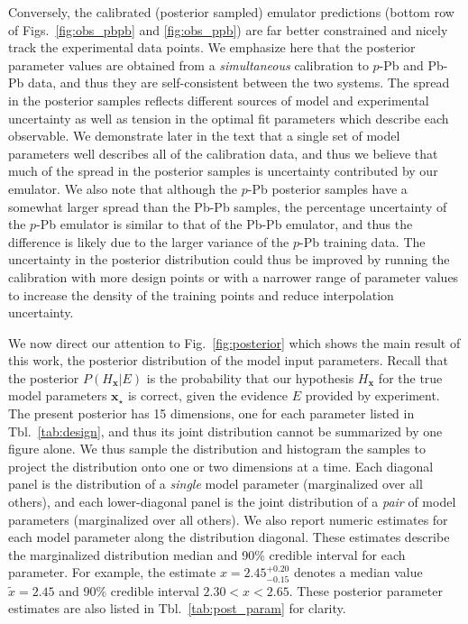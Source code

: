 \documentclass[aps,prc,reprint,amsmath,nofootinbib]{revtex4-1}
\newcommand{\x}{\mathbf x}
\begin{document}
Conversely, the calibrated (posterior sampled) emulator predictions (bottom row of Figs.~\ref{fig:obs_pbpb} and \ref{fig:obs_ppb}) are far better constrained and nicely track the experimental data points.
We emphasize here that the posterior parameter values are obtained from a \emph{simultaneous} calibration to $p$-Pb and Pb-Pb data, and thus they are self-consistent between the two systems.
The spread in the posterior samples reflects different sources of model and experimental uncertainty as well as tension in the optimal fit parameters which describe each observable.
We demonstrate later in the text that a single set of model parameters well describes all of the calibration data, and thus we believe that much of the spread in the posterior samples is uncertainty contributed by our emulator.
We also note that although the $p$-Pb posterior samples have a somewhat larger spread than the Pb-Pb samples, the percentage uncertainty of the $p$-Pb emulator is similar to that of the Pb-Pb emulator, and thus the difference is likely due to the larger variance of the $p$-Pb training data.
The uncertainty in the posterior distribution could thus be improved by running the calibration with more design points or with a narrower range of parameter values to increase the density of the training points and reduce interpolation uncertainty.

We now direct our attention to Fig.~\ref{fig:posterior} which shows the main result of this work, the posterior distribution of the model input parameters.
Recall that the posterior $P(H_\x | E)$ is the probability that our hypothesis $H_\x$ for the true model parameters $\x_\star$ is correct, given the evidence $E$ provided by experiment.
The present posterior has 15 dimensions, one for each parameter listed in Tbl.~\ref{tab:design}, and thus its joint distribution cannot be summarized by one figure alone.
We thus sample the distribution and histogram the samples to project the distribution onto one or two dimensions at a time.
Each diagonal panel is the distribution of a \emph{single} model parameter (marginalized over all others), and each lower-diagonal panel is the joint distribution of a \emph{pair} of model parameters (marginalized over all others).
We also report numeric estimates for each model parameter along the distribution diagonal.
These estimates describe the marginalized distribution median and 90\% credible interval for each parameter.
For example, the estimate $x=2.45_{-0.15}^{+0.20}$ denotes a median value $\tilde{x}=2.45$ and 90\% credible interval $2.30 < x < 2.65$.
These posterior parameter estimates are also listed in Tbl.~\ref{tab:post_param} for clarity.
\end{document}
